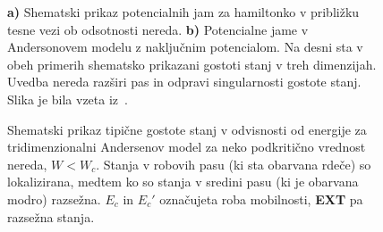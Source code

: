 \documentclass[10pt,a4paper]{article}
\begin{document}
\begin{minipage}[t]{0.42\textwidth} 
\begin{figure}[H]
\caption{\textbf{a)} Shematski prikaz potencialnih jam za hamiltonko v približku tesne vezi ob odsotnosti nereda. \textbf{b)} Potencialne jame v Andersonovem modelu z naključnim potencialom. Na desni sta v obeh primerih shematsko prikazani gostoti stanj v treh dimenzijah. Uvedba nereda razširi pas in odpravi singularnosti gostote stanj. Slika je bila vzeta iz~\cite{mott2012electronic}.}
\label{fig:band_structure} 
\end{figure}
\begin{figure}[H]
\caption{Shematski prikaz tipične gostote stanj v odvisnosti od energije za tridimenzionalni Andersenov model za neko podkritično vrednost nereda, $W<W_c$. Stanja v robovih pasu (ki sta obarvana rdeče) so lokalizirana, medtem ko so stanja v sredini pasu (ki je obarvana modro) razsežna. $E_c$ in $E_c'$ označujeta roba mobilnosti, \textbf{EXT} pa razsežna stanja. }
\label{fig:mob_edge_DOS} 
\end{figure}
\end{minipage}
\end{document}
